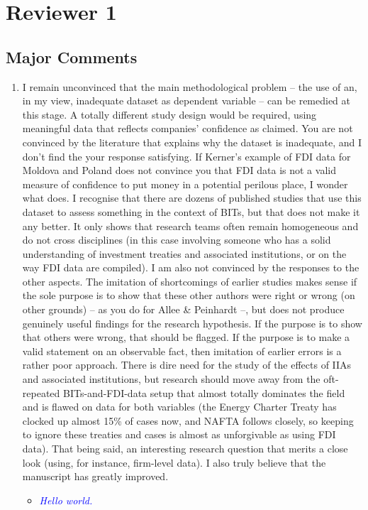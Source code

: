 \section{Reviewer 1}

\subsection{Major Comments}

\begin{enumerate}
	\item  I remain unconvinced that the main methodological problem -- the use of an, in my view, inadequate dataset as dependent variable -- can be remedied at this stage. A totally different study design would be required, using meaningful data that reflects companies' confidence as claimed. You are not convinced by the literature that explains why the dataset is inadequate, and I don't find the your response satisfying. If Kerner's example of FDI data for Moldova and Poland does not convince you that FDI data is not a valid measure of confidence to put money in a potential perilous place, I wonder what does. I recognise that there are dozens of published studies that use this dataset to assess something in the context of BITs, but that does not make it any better. It only shows that research teams often remain homogeneous and do not cross disciplines (in this case involving someone who has a solid understanding of investment treaties and associated institutions, or on the way FDI data are compiled). I am also not convinced by the responses to the other aspects. The imitation of shortcomings of earlier studies makes sense if the sole purpose is to show that these other authors were right or wrong (on other grounds) -- as you do for Allee \& Peinhardt --, but does not produce genuinely useful findings for the research hypothesis. If the purpose is to show that others were wrong, that should be flagged. If the purpose is to make a valid statement on an observable fact, then imitation of earlier errors is a rather poor approach. There is dire need for the study of the effects of IIAs and associated institutions, but research should move away from the oft-repeated BITs-and-FDI-data setup that almost totally dominates the field and is flawed on data for both variables (the Energy Charter Treaty has clocked up almost 15\% of cases now, and NAFTA follows closely, so keeping to ignore these treaties and cases is almost as unforgivable as using FDI data). That being said, an interesting research question that merits a close look (using, for instance, firm-level data). I also truly believe that the manuscript has greatly improved.
	\begin{itemize}
		\item \textcolor{blue}{ \emph{
		Hello world.
		}}
	\end{itemize}
\end{enumerate}
